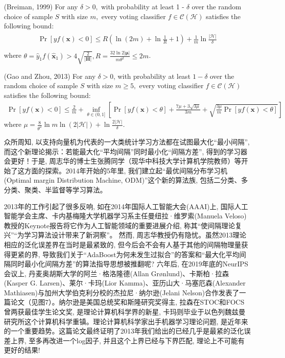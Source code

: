 \begin{mythm}{(Breiman, 1999)}{}\label{AIthm7.2}
For any $\delta>0,$ with probability at least 1 - $\delta$ over the random choice of sample $S$ with size $m,$ every voting classifier $f \in \mathcal{C}(\mathcal{H})$ satisfies the following bound:
\begin{align}
\begin{array}{cc}
    \operatorname{Pr}[y f(\boldsymbol{x})<0] \leq R\left(\ln (2 m)+\ln \frac{1}{R}+1\right)+\frac{1}{m} \ln \frac{|\mathcal{H}|}{\delta}\\
\end{array}
\end{align}
where $\theta=\hat{y}_{1} f\left(\hat{\boldsymbol{x}}_{1}\right)>4 \sqrt{\frac{2}{|\boldsymbol{H}|}}, R=\frac{32 \ln 2|\boldsymbol{\mu}|}{m \theta^{2}} \leq 2 m$.
\end{mythm}

\begin{mythm}{(Gao and Zhou, 2013)}{}\label{AIthm7.3}
For any $\delta>0$, with probability at least $1-\delta$ over the random choice of sample $S$ with size $m \geq 5,$ every voting classifier $f \in \mathcal{C}(\mathcal{H})$ satisfies the following bound:
\begin{align}
    \operatorname{Pr}[y f(\boldsymbol{x})<0] \leq \frac{2}{m}+\inf _{\theta \in(0,1]}\left[\operatorname{Pr}[y f(\boldsymbol{x})<\theta]+\frac{7 \mu+3 \sqrt{3 \mu}}{3 m}+\sqrt{\frac{3 \mu}{m} \operatorname{Pr}[y f(\boldsymbol{x})<\theta]}\right]
\end{align}
where $\mu=\frac{8}{\theta^{2}} \ln m \ln (2|\mathcal{H}|)+\ln \frac{2|\mathcal{H}|}{\delta}$.
\end{mythm}

众所周知, 以支持向量机为代表的一大类统计学习方法都在试图最大化“最小间隔”, 而这个新理论揭示：若能最大化“平均间隔”同时最小化“间隔方差”, 得到的学习器会更好！于是, 周志华的博士生张腾同学（现华中科技大学计算机学院教师）等开始了这方面的探索。2014年开始的5年里, 我们建立起“最优间隔分布学习机(Optimal margin Distribution Machine, ODM)”这个新的算法族, 包括二分类、多分类、聚类、半监督等学习算法。

2013年的工作引起了很多反响, 如在2014年国际人工智能大会(AAAI)上, 国际人工智能学会主席、卡内基梅隆大学机器学习系主任曼纽拉·维罗索(Manuela Veloso)教授的Keynote报告将它作为人工智能领域的重要进展介绍, 称其“使间隔理论复兴”“为学习算法设计带来了新洞察”。
然而, 周志华教授仍有隐忧。虽然2013理论相应的泛化误差界在当时是最紧致的, 但今后会不会有人基于其他的间隔物理量获得更紧的界, 导致我们关于“AdaBoost为何未发生过拟合”的答案和“最大化平均间隔同时最小化间隔方差”的算法指导思想被推翻呢?
六年后, 在2019年底的NeurIPS会议上, 丹麦奥胡斯大学的阿兰·格洛隆德(Allan Grønlund)、卡斯柏·拉森(Kasper G. Larsen)、莱尔·卡玛(Lior Kamma)、亚历山大·马塞厄森(Alexander Mathiasen)与加州大学伯克利分校的杰拉尼·纳尔逊(Jelani Nelson)合作发表了一篇论文（见图7）。纳尔逊是美国总统奖和斯隆研究奖得主, 拉森在STOC和FOCS曾两获最佳学生论文奖, 是理论计算机科学界的新星, 卡玛则毕业于以色列魏兹曼研究所这个计算机科学重镇。理论计算机科学家出手机器学习理论问题, 是近年来的一个重要趋势。这篇论文最终证明了2013年我们给出的已经几乎是最紧的泛化误差上界, 至多再改进一个log因子, 并且这个上界已经与下界匹配, 理论上不可能有更好的结果!
